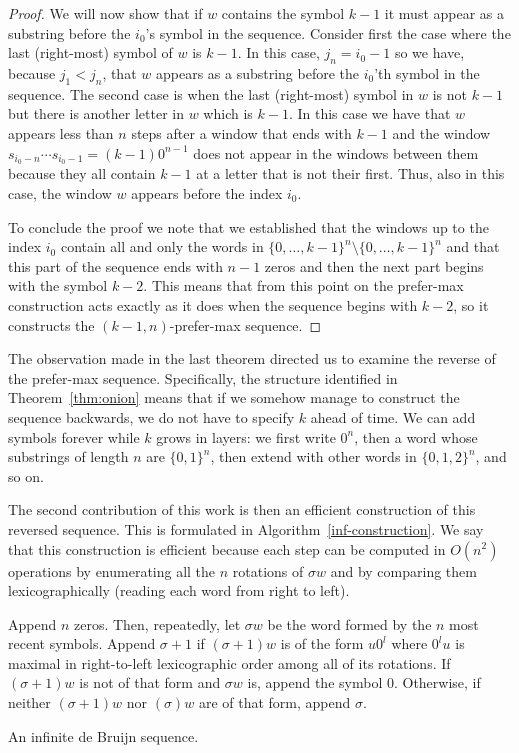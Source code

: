 \documentclass{article}
\theoremstyle{definition}
\begin{document}
\begin{proof}
	We will now show that if $w$ contains the symbol $k-1$ it must appear as a substring before the $i_0$'s symbol in the sequence. Consider first the case where the last (right-most) symbol of $w$ is $k-1$. In this case, $j_n=i_{0}-1$ so we have, because $j_1 < j_n$, that $w$ appears as a substring before the $i_0$'th symbol in the sequence. The second case is when the last (right-most) symbol in $w$ is not $k-1$ but there is another letter in $w$ which is $k-1$. In this case we have that $w$ appears less than $n$ steps after a window that ends with $k-1$ and the window $s_{i_0-n}\cdots s_{i_0-1}=(k-1)0^{n-1}$ does not appear in the windows between them because they all contain $k-1$ at a letter that is not  their first. Thus, also in this case, the window $w$ appears before the index $i_0$.
	
	To conclude the proof we note that we established that the windows up to the index $i_0$ contain all and only the words in $\{0,\dots,k-1\}^n \setminus \{0,\dots,k-1\}^n$ and that this part of the sequence ends with $n-1$ zeros and then the next part begins with the symbol $k-2$. This means that from this point on the prefer-max construction acts exactly as it does when the sequence begins with $k-2$, so it constructs the $(k-1,n)$-prefer-max sequence.
\end{proof}  
 

The observation made in the last theorem directed us to examine the reverse of the prefer-max sequence. Specifically, the structure identified in Theorem~\ref{thm:onion} means that if we somehow manage to construct the sequence backwards, we do not have to specify $k$ ahead of time. We can add symbols forever while $k$ grows in layers: we first write $0^n$, then a word whose substrings of length $n$ are $\{0,1\}^n$, then extend with other words in $\{0,1,2\}^n$, and so on.

The second contribution of this work is then an efficient construction of this reversed sequence. This is formulated in Algorithm~\ref{inf-construction}. We say that this construction is efficient because each step can be computed in $O(n^2)$ operations by enumerating all the $n$ rotations of $\sigma w$ and by comparing them lexicographically (reading each word from right to left).


\begin{algorithm}[!h]
	Append $n$ zeros. Then, repeatedly, let $\sigma w$ be the word formed by the $n$ most recent symbols. Append $\sigma+1$ if $(\sigma+1)w$ is of the form $u0^l$ where $0^lu$ is maximal in right-to-left lexicographic order among all of its rotations. If $(\sigma+1)w$ is not of that form and $\sigma w$ is, append the symbol $0$. Otherwise, if neither $(\sigma+1)w$ nor $(\sigma)w$ are of that form, append $\sigma$.
	\caption{An infinite de Bruijn sequence.}
	\label{inf-construction}
\end{algorithm}
\end{document}
